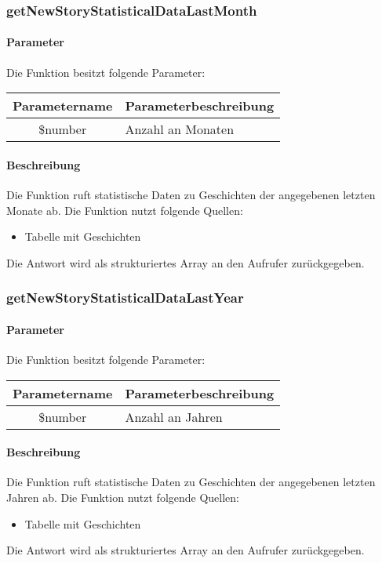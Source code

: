 \subsubsection{getNewStoryStatisticalDataLastMonth}
\paragraph{Parameter} Die Funktion besitzt folgende Parameter:
\begin{table}[H]
	\begin{tabular}{|c|p{11cm}|}
		\hline
		\textbf{Parametername} & \textbf{Parameterbeschreibung} \\ \hline
		\$number & Anzahl an Monaten \\ \hline
	\end{tabular}
\end{table}
\paragraph{Beschreibung} Die Funktion ruft statistische Daten zu Geschichten der angegebenen letzten Monate ab. Die Funktion nutzt folgende Quellen:
\begin{itemize}
	\item Tabelle mit Geschichten
\end{itemize}
Die Antwort wird als strukturiertes Array an den Aufrufer zurückgegeben.
\subsubsection{getNewStoryStatisticalDataLastYear}
\paragraph{Parameter} Die Funktion besitzt folgende Parameter:
\begin{table}[H]
	\begin{tabular}{|c|p{11cm}|}
		\hline
		\textbf{Parametername} & \textbf{Parameterbeschreibung} \\ \hline
		\$number & Anzahl an Jahren \\ \hline
	\end{tabular}
\end{table}
\paragraph{Beschreibung} Die Funktion ruft statistische Daten zu Geschichten der angegebenen letzten Jahren ab. Die Funktion nutzt folgende Quellen:
\begin{itemize}
	\item Tabelle mit Geschichten
\end{itemize}
Die Antwort wird als strukturiertes Array an den Aufrufer zurückgegeben.
